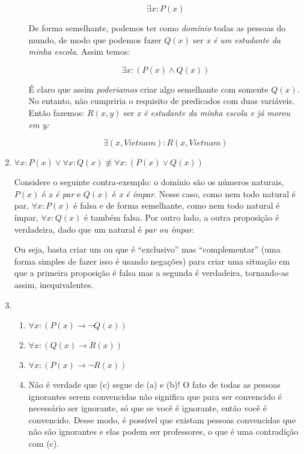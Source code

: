 \documentclass{article}
\begin{document}
\begin{enumerate}
\begin{enumerate}
                \[ \exists x : P(x) \] 

                De forma semelhante, podemos ter como \textit{domínio} todas as pessoas do mundo, de modo que podemos fazer \( Q(x) \) ser \textit{x é um estudante da minha escola}. Assim temos:

                \[ \exists x : (P(x) \land Q(x)) \] 

                É claro que assim \textit{poderiamos} criar algo semelhante com somente \( Q(x) \). No entanto, não cumpriria o requisito de predicados com duas variáveis. Então fazemos: \( R(x,y) \) ser \textit{x é estudante da minha escola e já morou em y:}

                \[ \exists (x,Vietnam) : R(x,Vietnam) \]

        \end{enumerate}

    \item \( \forall x : P(x) \lor \forall x : Q(x) \not\equiv \forall x : (P(x) \lor Q(x))\) 

        Considere o seguinte contra-exemplo: o domínio são os números naturais, \( P(x) \) é \textit{x é par} e \( Q(x) \) é \textit{x é ímpar}. Nesse caso, como nem todo natural é par, \( \forall x : P(x) \) é falsa e de forma semelhante, como nem todo natural é ímpar, \( \forall x : Q(x) \) é também falsa. Por outro lado, a outra proposição é verdadeira, dado que um natural é \textit{par ou ímpar}.

        Ou seja, basta criar um ou que é ``exclusivo'' mas ``complementar'' (uma forma simples de fazer isso é usando negações) para criar uma situação em que a primeira proposição é falsa mas a segunda é verdadeira, tornando-as assim, inequivalentes.

    \item 
        \begin{enumerate}
            \item \( \forall x : (P(x) \to \neg Q(x)) \) 
            \item \( \forall x : (Q(x) \to R(x)) \) 
            \item \( \forall x : (P(x) \to \neg R(x)) \)
            \item Não é verdade que (c) segue de (a) e (b)! O fato de todas as pessoas ignorantes serem convencidas não significa que para ser convencido é necessário ser ignorante, só que se você é ignorante, então você é convencido. Desse modo, é possível que existam pessoas convencidas que não são ignorantes e elas podem ser professores, o que é uma contradição com (c).
        \end{enumerate}


\end{enumerate}
\end{document}
